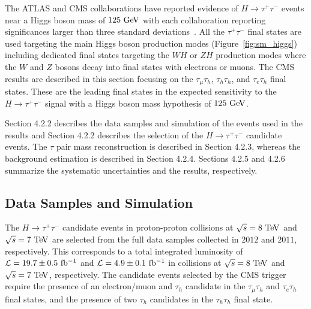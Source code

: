 The ATLAS and CMS collaborations have reported evidence of $H\rightarrow\tau^{+}\tau^{-}$ events near a Higgs boson mass of $125~\mathrm{Ge\kern -0.1em V}$ with each collaboration reporting significances larger than three standard deviations~\cite{Aad:2015vsa,Chatrchyan:2014nva}. All the $\tau^{+}\tau^{-}$ final states are used targeting the main Higgs boson production modes (Figure~\ref{fig:sm_higgs}) including dedicated final states targeting the $WH$ or $ZH$ production modes where the $W$ and $Z$ bosons decay into final states with electrons or muons. The CMS results are described in this section focusing on the $\tau_{\mu}\tau_{h}$, $\tau_{h}\tau_{h}$, and $\tau_{e}\tau_{h}$ final states. These are the leading final states in the expected sensitivity to the $H \rightarrow \tau^{+}\tau^{-}$ signal with a Higgs boson mass hypothesis of $125~\mathrm{Ge\kern -0.1em V}$. 

Section 4.2.2 describes the data samples and simulation of the events used in the results and Section 4.2.2 describes the selection of the $H\rightarrow\tau^{+}\tau^{-}$ candidate events. The $\tau$ pair mass reconstruction is described in Section 4.2.3, whereas the background estimation is described in Section 4.2.4. Sections 4.2.5 and 4.2.6 summarize the systematic uncertainties and the results, respectively.

\subsection{Data Samples and Simulation}

The $H \rightarrow \tau^{+}\tau^{-}$ candidate events in proton-proton collisions at $\sqrt{s}=8~\mathrm{Te\kern -0.1em V}$ and $\sqrt{s}=7~\mathrm{Te\kern -0.1em V}$ are selected from the full data samples collected in $2012$ and $2011$, respectively. This corresponds to a total integrated luminosity of $\mathcal{L}=19.7\pm0.5~\mathrm{fb^{-1}}$ and  $\mathcal{L}=4.9\pm0.1~\mathrm{fb^{-1}}$ in collisions at $\sqrt{s}=8~\mathrm{Te\kern -0.1em V}$ and $\sqrt{s}=7~\mathrm{Te\kern -0.1em V}$, respectively. The candidate events selected by the CMS trigger require the presence of an electron/muon and $\tau_h$ candidate in the $\tau_{\mu}\tau_{h}$ and $\tau_{e}\tau_{h}$ final states, and the presence of two $\tau_h$ candidates in the  $\tau_{h}\tau_{h}$ final state.

